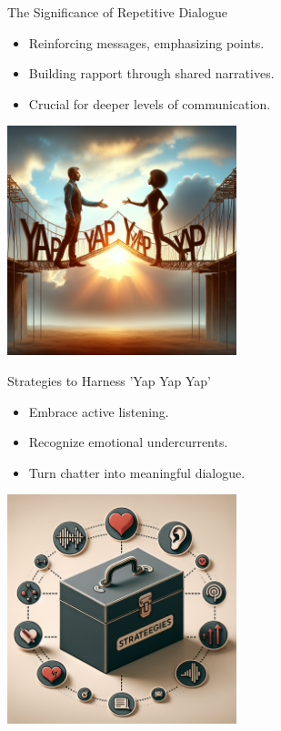 \documentclass{beamer}
\begin{document}
\begin{frame}{The Significance of Repetitive Dialogue}
\begin{itemize}
    \item Reinforcing messages, emphasizing points.
    \item Building rapport through shared narratives.
    \item Crucial for deeper levels of communication.
\end{itemize}
\centering
\includegraphics[width=0.5\textwidth]{./images/significance.png}
\end{frame}

\begin{frame}{Strategies to Harness 'Yap Yap Yap'}
\begin{itemize}
    \item Embrace active listening.
    \item Recognize emotional undercurrents.
    \item Turn chatter into meaningful dialogue.
\end{itemize}
\centering
\includegraphics[width=0.5\textwidth]{./images/strategies.png}
\end{frame}
\end{document}
